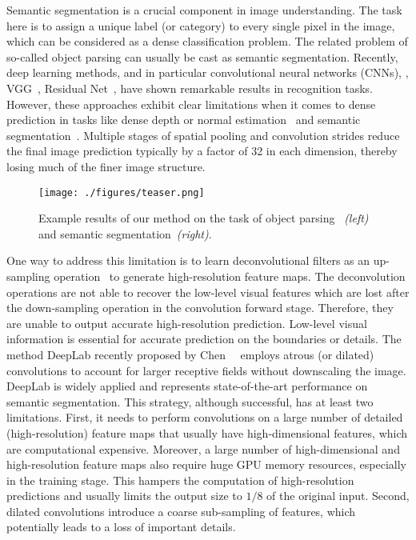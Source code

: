 \documentclass[10pt,twocolumn,letterpaper]{article}
\newcommand{\ep}[1]{\emph{(#1)}}
\begin{document}
Semantic segmentation is a crucial component in image understanding. The task here is to assign a unique label (or category) to every single pixel in the image, which can be considered as a dense classification problem. The related problem of so-called object parsing can usually be cast as semantic segmentation.
Recently, deep learning methods, and in particular convolutional neural networks (CNNs), \eg, VGG~\cite{simonyan2014very}, Residual Net~\cite{He:2016:ResNet}, have shown remarkable results in recognition tasks. 
However, these approaches exhibit clear limitations when it comes to dense prediction in tasks like dense depth or normal estimation~\cite{eigen2015predicting,liu2014deep,liu2015learning} and semantic segmentation~\cite{LongSD14,ChenPKMY14}. Multiple stages of spatial pooling and convolution strides reduce the final image prediction typically by a factor of 32 in each dimension, thereby losing much of the finer image structure.

\begin{figure}[t]
	\centering	
	\texttt{[image: ./figures/teaser.png]}	
\caption{Example results of our method on the task of object parsing~ \ep{left} and semantic segmentation~\ep{right}.}
\label{fig:teaser}
\end{figure}
One way to address this limitation is to learn deconvolutional filters as an up-sampling operation~\cite{noh2015learning,LongSD14} to generate high-resolution feature maps. 
The deconvolution operations are not able to recover the low-level visual features which are lost after the down-sampling operation in the convolution forward stage. Therefore,
they are unable to output accurate high-resolution prediction. Low-level visual information is essential for accurate prediction on the boundaries or details.
The method DeepLab recently proposed by Chen~\etal~\cite{ChenPK0Y16} employs atrous (or dilated) convolutions to account for larger receptive fields without downscaling the image. 
DeepLab is widely applied and represents state-of-the-art performance on semantic segmentation.
This strategy, although successful, has at least two limitations. 
First, it needs to perform convolutions on a large number of detailed (high-resolution) feature maps that usually have high-dimensional features, which are computational expensive.
Moreover, a large number of high-dimensional and high-resolution feature maps also require huge GPU memory resources, especially in the training stage.
This hampers the computation of high-resolution predictions and usually limits the output size to $1/8$ of the original input.
Second, dilated convolutions introduce a coarse sub-sampling of features, which potentially leads to a loss of important details. 
\end{document}
